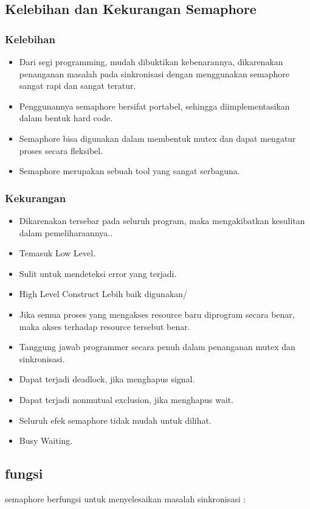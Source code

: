 	\subsection{Kelebihan dan Kekurangan Semaphore}
		\subsubsection{Kelebihan}
			\begin{itemize}
				\item Dari segi programming, mudah dibuktikan kebenarannya, dikarenakan penanganan masalah pada sinkronisasi dengan menggunakan semaphore sangat rapi dan sangat teratur.
				\item Penggunannya semaphore bersifat portabel, sehingga diimplementasikan dalam bentuk hard code.
				\item Semaphore bisa digunakan dalam membentuk mutex dan dapat mengatur proses secara fleksibel.
				\item Semaphore merupakan sebuah tool yang sangat serbaguna.
			\end{itemize}
		
		\subsubsection{Kekurangan}
			\begin{itemize}
				\item Dikarenakan tersebar pada seluruh program, maka mengakibatkan kesulitan dalam pemeliharaannya..
				\item Temasuk Low Level.
				\item Sulit untuk mendeteksi error yang terjadi.
				\item High Level Construct Lebih baik digunakan/
				\item Jika semua proses yang mengakses resource baru diprogram secara benar, maka akses terhadap resource tersebut benar.
				\item Tanggung jawab programmer secara penuh dalam penanganan mutex dan sinkronisasi.
				\item Dapat terjadi deadlock, jika menghapus signal.
				\item Dapat terjadi nonmutual exclusion, jika menghapus wait.
				\item Seluruh efek semaphore tidak mudah untuk dilihat.
				\item Busy Waiting.
			\end{itemize}

		\subsection {fungsi}
		 semaphore berfungsi untuk menyelesaikan  masalah sinkronisasi :
		 
